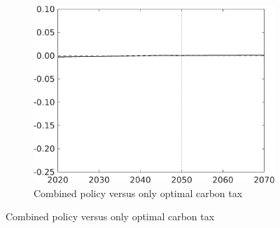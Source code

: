 \begin{figure}[h!!!]
\begin{subfigure}{0.32\textwidth}
\end{subfigure}
\begin{subfigure}{0.32\textwidth}
	\caption{\footnotesize{Combined policy versus only optimal carbon tax}}
	\includegraphics[width=1\textwidth]{../../codding_model/own_basedOnFried/optimalPol_010922_revision/figures/all_13Sept22_Tplus30/CountTAUFPerDif_Opt_target_GFF_nsk0_xgr0_knspil0_regime4_spillover0_sep0_extern0_PV1_etaa0.79.png}
\end{subfigure}	

\end{figure}
\clearpage
